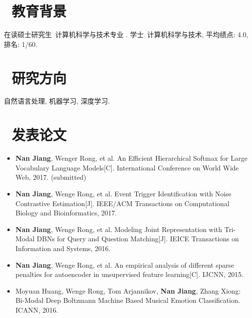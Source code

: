 \documentclass{resume}
\begin{document}



\section{\faGraduationCap\  教育背景}
在读硕士研究生\ 计算机科学与技术专业 .
学士\ 计算机科学与技术, 平均绩点: 4.0, 排名: 1/60.

\section{\faLightbulbO\ 研究方向}
自然语言处理, 机器学习, 深度学习.


\section{\faBook\ 发表论文 }
\begin{itemize}[parsep=0.5ex]
\item \textbf{Nan Jiang}, Wenger Rong, et al. An Efficient Hierarchical Softmax for Large Vocabulary Language Models[C]. International Conference on World Wide Web, 2017. (submitted)
\item \textbf{Nan Jiang}, Wenge Rong, et al. Event Trigger Identification with Noise Contrastive Estimation[J]. IEEE/ACM Transactions on Computational Biology and Bioinformatics, 2017.

\item \textbf{Nan Jiang}, Wenge Rong, et al. Modeling Joint Representation with Tri-Modal DBNs for Query and Question Matching[J]. IEICE Transactions on Information and Systems, 2016.

\item \textbf{Nan Jiang}, Wenge Rong, et al. An empirical analysis of different sparse penalties for autoencoder in unsupervised feature learning[C]. IJCNN, 2015.

\item Moyuan Huang, Wenge Rong, Tom Arjannikov, \textbf{Nan Jiang}, Zhang Xiong: Bi-Modal Deep Boltzmann Machine Based Musical Emotion Classification. ICANN, 2016.
\end{itemize}
\end{document}
